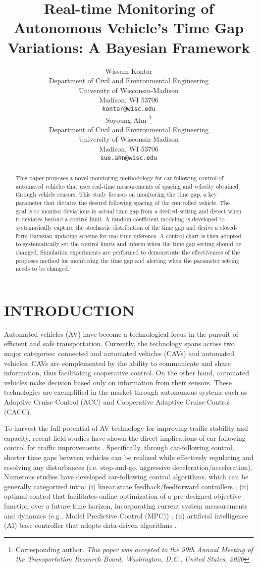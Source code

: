 \documentclass{article}
\title{Real-time Monitoring of Autonomous Vehicle's Time Gap Variations: A Bayesian Framework}
\author{
  Wissam Kontar \\
  Department of Civil and Environmental Engineering\\
  University of Wisconsin-Madison\\
  Madison, WI 53706 \\
  \texttt{kontar@wisc.edu} \\
   \And
 Soyoung Ahn \thanks{Corresponding author. \emph{This paper was accepted to the 99th Annual Meeting of the Transportation Research Board, Washington, D.C., United States, 2020 } } \\
  Department of Civil and Environmental Engineering\\
  University of Wisconsin-Madison\\
  Madison, WI 53706 \\
  \texttt{sue.ahn@wisc.edu} \\
}
\begin{document}
\maketitle

\begin{abstract}
This paper proposes a novel monitoring methodology for car-following control of automated vehicles that uses real-time measurements of spacing and velocity obtained through vehicle sensors. This study focuses on monitoring the time gap, a key parameter that dictates the desired following spacing of the controlled vehicle. The goal is to monitor deviations in actual time gap from a desired setting and detect when it deviates beyond a control limit. A random coefficient modeling is developed to systematically capture the stochastic distribution of the time gap and derive a closed-form Bayesian updating scheme for real-time inference. A control chart is then adopted to systematically set the control limits and inform when the time gap setting should be changed. Simulation experiments are performed to demonstrate the effectiveness of the proposes method for monitoring the time gap and alerting when the parameter setting needs to be changed.
\end{abstract}




\section{\uppercase{Introduction}}
Automated vehicles (AV) have become a technological focus in the pursuit of efficient and safe transportation. Currently, the technology spans across two major categories: connected and automated vehicles (CAVs) and automated vehicles. CAVs are complemented by the ability to communicate and share information, thus facilitating cooperative control. On the other hand, automated vehicles make decision based only on information from their sensors. These technologies are exemplified in the market through autonomous systems such as Adaptive Cruise Control (ACC) and Cooperative Adaptive Cruise Control (CACC). 

To harvest the full potential of AV technology for improving traffic stability and capacity, recent field studies have shown the direct implications of car-following control for traffic improvements \cite{milanes2013cooperative,perez2013cooperative,shladover2012impacts}. Specifically, through car-following control, shorter time gaps between vehicles can be realized while effectively regulating and resolving any disturbances (i.e. stop-and-go, aggressive deceleration/acceleration). Numerous studies have developed car-following control algorithms, which can be generally categorized intro: (i) linear state feedback/feedforward controllers \cite{swaroop1994comparision,swaroop1996string}; (ii) optimal control that facilitates online optimization of a pre-designed objective function over a future time horizon, incorporating current system measurements and dynamics (e.g., Model Predictive Control (MPC)) \cite{wang2014rolling,zhou2017rolling}; (ii) artificial intelligence (AI) base controller that adopts data-driven algorithms \cite{zhang2017consensus}. 
\end{document}
